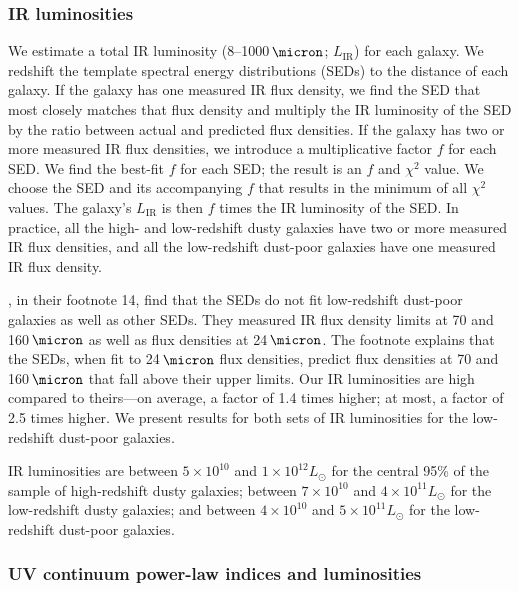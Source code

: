 \documentclass[preprint]{aastex}
\begin{document}
\subsubsection{IR luminosities}

We estimate a total IR luminosity (8--1000$\,\micron$; $L_{\mathrm{IR}}$) for
each galaxy.  We redshift the \citet{chary01} template spectral energy
distributions (SEDs) to the distance of each galaxy.  If the galaxy has one
measured IR flux density, we find the SED that most closely matches that flux
density and multiply the IR luminosity of the SED by the ratio between actual
and predicted flux densities.  If the galaxy has two or more measured IR flux
densities, we introduce a multiplicative factor $f$ for each SED.  We find the
best-fit $f$ for each SED; the result is an $f$ and $\chi^{2}$ value.  We
choose the SED and its accompanying $f$ that results in the
minimum of all $\chi^{2}$ values.  The galaxy's $L_{\mathrm{IR}}$ is then $f$
times the IR luminosity of the SED.  In practice, all the high- and
low-redshift dusty galaxies have two or more measured IR flux densities, and
all the low-redshift dust-poor galaxies have one measured IR flux density.

\citet{overzier11}, in their footnote 14, find that the \citet{chary01} SEDs do
not fit low-redshift dust-poor galaxies as well as other SEDs.  They measured
IR flux density limits at 70 and 160$\,\micron$ as well as flux densities at
24$\,\micron$.  The footnote explains that the \citet{chary01} SEDs, when
fit to 24$\,\micron$ flux densities, predict flux densities at 70 and
160$\,\micron$ that fall above their upper limits.  Our IR luminosities are
high compared to theirs---on average, a factor of 1.4 times higher; at most, a
factor of 2.5 times higher.  We present results for both sets of IR
luminosities for the low-redshift dust-poor galaxies.

IR luminosities are between $5\times10^{10}$ and $1\times10^{12} L_{\odot}$
for the central 95\% of the sample of high-redshift dusty galaxies; between
$7\times10^{10}$ and $4\times10^{11} L_{\odot}$ for the low-redshift dusty
galaxies; and between $4\times10^{10}$ and $5\times10^{11} L_{\odot}$ for
the low-redshift dust-poor galaxies.

\subsubsection{UV continuum power-law indices and luminosities}
\end{document}
